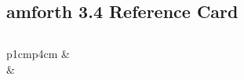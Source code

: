 \documentclass[a4paper,10pt]{article}
\def\colsa{p{1cm}p{4cm}}
\begin{document}
\thispagestyle{empty}
\pagestyle{empty}

\begin{footnotesize}
\section*{\Large amforth 3.4 Reference Card}
\begin{multicols}{3}

\subsection*{}
\begin{tabular}{\colsa}
% 
\verb||  & \verb//\\
              & \verb//\\
\end{tabular}


\end{multicols}
\end{footnotesize}
\end{document}
